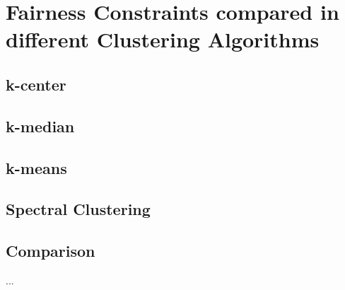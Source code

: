 \section{Fairness Constraints compared in different Clustering Algorithms}

\subsection{k-center}
\textcite[]{Chierichetti2018}

\subsection{k-median}
\textcite[]{Chierichetti2018}

\subsection{k-means}
\textcite[]{Schmidt2018}

\subsection{Spectral Clustering}
\textcite[]{Kawale2013}

\subsection{Comparison}
...

